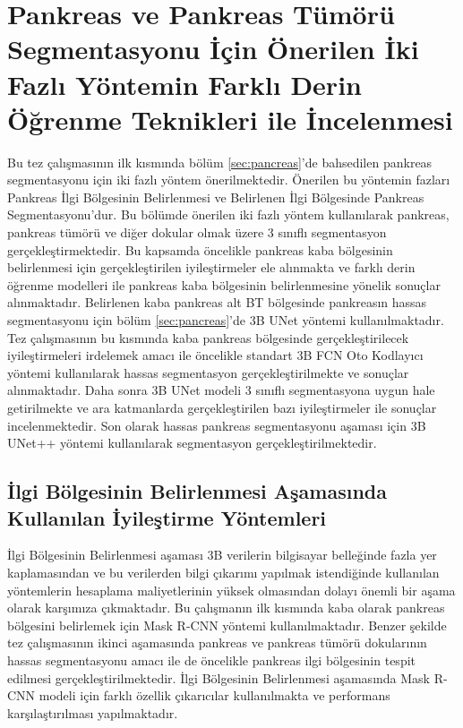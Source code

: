 \section{Pankreas ve Pankreas Tümörü Segmentasyonu İçin Önerilen İki Fazlı Yöntemin Farklı Derin Öğrenme Teknikleri ile İncelenmesi}

Bu tez çalışmasının ilk kısmında bölüm \ref{sec:pancreas}'de  bahsedilen pankreas segmentasyonu için iki fazlı yöntem önerilmektedir. Önerilen bu yöntemin fazları Pankreas İlgi Bölgesinin Belirlenmesi ve Belirlenen İlgi Bölgesinde Pankreas Segmentasyonu'dur. Bu bölümde önerilen iki fazlı yöntem kullanılarak pankreas, pankreas tümörü ve diğer dokular olmak üzere 3 sınıflı segmentasyon gerçekleştirmektedir. Bu kapsamda öncelikle pankreas kaba bölgesinin belirlenmesi için gerçekleştirilen iyileştirmeler ele alınmakta ve farklı derin öğrenme modelleri ile pankreas kaba bölgesinin belirlenmesine yönelik sonuçlar alınmaktadır. Belirlenen kaba pankreas alt BT bölgesinde pankreasın hassas segmentasyonu için bölüm \ref{sec:pancreas}'de 3B UNet yöntemi kullanılmaktadır. Tez çalışmasının bu kısmında kaba pankreas bölgesinde gerçekleştirilecek iyileştirmeleri irdelemek amacı ile öncelikle standart 3B FCN Oto Kodlayıcı yöntemi kullanılarak hassas segmentasyon gerçekleştirilmekte ve sonuçlar alınmaktadır. Daha sonra 3B UNet modeli 3 sınıflı segmentasyona uygun hale getirilmekte ve ara katmanlarda gerçekleştirilen bazı iyileştirmeler ile sonuçlar incelenmektedir. Son olarak hassas pankreas segmentasyonu aşaması için 3B UNet++ yöntemi  kullanılarak segmentasyon gerçekleştirilmektedir. 

\subsection{İlgi Bölgesinin Belirlenmesi Aşamasında Kullanılan İyileştirme Yöntemleri}

İlgi Bölgesinin Belirlenmesi aşaması 3B verilerin bilgisayar belleğinde fazla yer kaplamasından ve bu verilerden bilgi çıkarımı yapılmak istendiğinde kullanılan yöntemlerin hesaplama maliyetlerinin yüksek olmasından dolayı önemli bir aşama olarak karşımıza çıkmaktadır. Bu çalışmanın ilk kısmında kaba olarak pankreas bölgesini belirlemek için Mask R-CNN yöntemi kullanılmaktadır. Benzer şekilde tez çalışmasının ikinci aşamasında pankreas ve pankreas tümörü dokularının hassas segmentasyonu amacı ile de öncelikle pankreas ilgi bölgesinin tespit edilmesi gerçekleştirilmektedir. İlgi Bölgesinin Belirlenmesi aşamasında Mask R-CNN modeli için farklı özellik çıkarıcılar kullanılmakta ve performans karşılaştırılması yapılmaktadır. 

